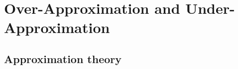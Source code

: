 \chapter{Over-Approximation and Under-Approximation}
\section{Approximation theory}
\begin{comment}
$F = \exists x_1 \in I_1 \cdots x_n \in I_n. \bigwedge \limits_j \psi_j(x_1,\cdots,x_n)$, 
where $\psi_j(x_1,\cdots,x_n)$ is an atomic formula. 
%
$F$ is equivalnet to 
$\exists x_1 \ldots x_n. (\bigwedge \limits_i x_i \in I_i) \wedge (\bigwedge \limits_j \psi_j(x_1,\cdots,x_n))$, 
and we call $\bigwedge \limits_i x_i \in I_i$ {\em interval constraints}, and 
we refer $\bigwedge \limits_j \psi_j(x_1,\cdots,x_n)$ by $\psi(x_1,\cdots,x_n)$. 
Initially, interval constraints have a form of the conjunction $\bigwedge \limits_i x_i \in I_i$, 
and later by refinement, $x_i \in I_i$ is decomposed into a clause $\bigvee_j x_i \in I_{i_j}$, 
which makes a CNF. 

As an SMT (SAT modulo theory) problem, 
boolean variables are assigned to each $x_i \in I_{i_j}$, 
and truth assignments is produced by a SAT solver, 
which are proved or disproved by a background theory $T$ whether it satisfies $\psi(x_1,\cdots,x_n)$. 

As notational convention, $m$ (the lower case) denotes 
a variable assignments on $x_i$'s, and 
$M$ (the upper case) denotes a truth assignment on $x_i \in I_{i_j}$'s. 
We write $m \in M$ when an instance $m = \{ x_i \leftarrow c_i \}$ satisfies 
all $c_i \in I_{i_j}$ that are assigned true by $M$. 

We assume {\em very lazy theory learning}~\cite{dpll}, and 
a backend theory $T$ is applied only for a full truth assignment $M$. 
\begin{itemize}
\item If an instance $m$ satisfies $\psi(x_1,\cdots,x_n)$, we denote $m \models_T \psi(x_1,\cdots,x_n)$. 
\item If each instance $m$ with $m \in M$ satisfies $\psi(x_1,\cdots,x_n)$, 
we denote $M \models_T \psi(x_1,\cdots,x_n)$. 
\end{itemize}
\end{comment}

